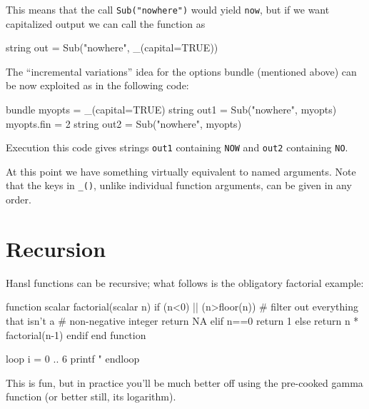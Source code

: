 This means that the call \texttt{Sub("nowhere")} would yield \texttt{now},
but if we want capitalized output we can call the function as
\begin{code}
  string out = Sub("nowhere", _(capital=TRUE))
\end{code}

The ``incremental variations'' idea for the options bundle (mentioned
above) can be now exploited as in the following code:
\begin{code}
  bundle myopts = _(capital=TRUE)
  string out1 = Sub("nowhere", myopts)
  myopts.fin = 2
  string out2 = Sub("nowhere", myopts)
\end{code}
Execution this code gives strings \texttt{out1} containing \texttt{NOW} and
\texttt{out2} containing \texttt{NO}.

At this point we have something virtually equivalent to named arguments.
Note that the keys in \verb|_()|, unlike individual function arguments, can
be given in any order.

\section{Recursion}

Hansl functions can be recursive; what follows is the obligatory
factorial example:
\begin{code}
function scalar factorial(scalar n)
    if (n<0) || (n>floor(n))
        # filter out everything that isn't a
        # non-negative integer
        return NA
    elif n==0
        return 1
    else
        return n * factorial(n-1)
    endif
end function

loop i = 0 .. 6
    printf "%
endloop
\end{code}

This is fun, but in practice you'll be much better off using the
pre-cooked gamma function (or better still, its logarithm).

